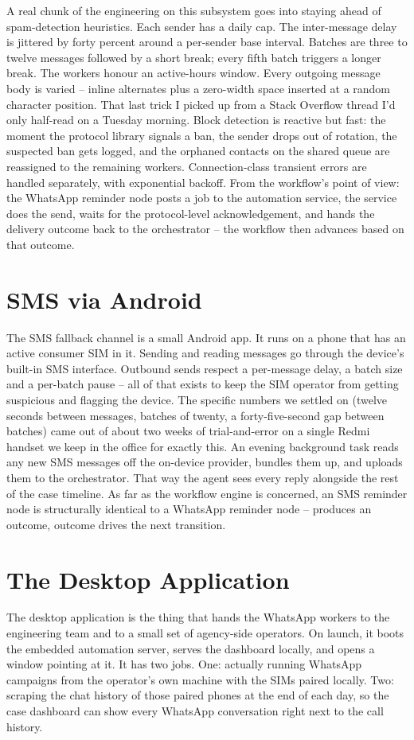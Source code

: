 A real chunk of the engineering on this subsystem goes into staying ahead of spam-detection heuristics. Each sender has a daily cap. The inter-message delay is jittered by forty percent around a per-sender base interval. Batches are three to twelve messages followed by a short break; every fifth batch triggers a longer break. The workers honour an active-hours window. Every outgoing message body is varied -- inline alternates plus a zero-width space inserted at a random character position. That last trick I picked up from a Stack Overflow thread I'd only half-read on a Tuesday morning. Block detection is reactive but fast: the moment the protocol library signals a ban, the sender drops out of rotation, the suspected ban gets logged, and the orphaned contacts on the shared queue are reassigned to the remaining workers. Connection-class transient errors are handled separately, with exponential backoff. From the workflow's point of view: the WhatsApp reminder node posts a job to the automation service, the service does the send, waits for the protocol-level acknowledgement, and hands the delivery outcome back to the orchestrator -- the workflow then advances based on that outcome.

\section{SMS via Android}
The SMS fallback channel is a small Android app. It runs on a phone that has an active consumer SIM in it. Sending and reading messages go through the device's built-in SMS interface. Outbound sends respect a per-message delay, a batch size and a per-batch pause -- all of that exists to keep the SIM operator from getting suspicious and flagging the device. The specific numbers we settled on (twelve seconds between messages, batches of twenty, a forty-five-second gap between batches) came out of about two weeks of trial-and-error on a single Redmi handset we keep in the office for exactly this. An evening background task reads any new SMS messages off the on-device provider, bundles them up, and uploads them to the orchestrator. That way the agent sees every reply alongside the rest of the case timeline. As far as the workflow engine is concerned, an SMS reminder node is structurally identical to a WhatsApp reminder node -- produces an outcome, outcome drives the next transition.

\section{The Desktop Application}
The desktop application is the thing that hands the WhatsApp workers to the engineering team and to a small set of agency-side operators. On launch, it boots the embedded automation server, serves the dashboard locally, and opens a window pointing at it. It has two jobs. One: actually running WhatsApp campaigns from the operator's own machine with the SIMs paired locally. Two: scraping the chat history of those paired phones at the end of each day, so the case dashboard can show every WhatsApp conversation right next to the call history.

